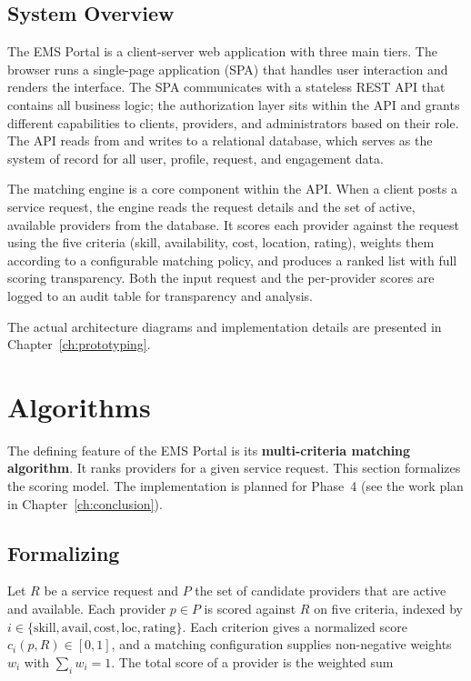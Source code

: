 \subsection{System Overview}
The EMS Portal is a client-server web application with three main tiers. The
browser runs a single-page application (SPA) that handles user interaction and
renders the interface. The SPA communicates with a stateless REST API that
contains all business logic; the authorization layer sits within the API and
grants different capabilities to clients, providers, and administrators based on
their role. The API reads from and writes to a relational database, which serves
as the system of record for all user, profile, request, and engagement data.

The matching engine is a core component within the API. When a client posts a
service request, the engine reads the request details and the set of active,
available providers from the database. It scores each provider against the request
using the five criteria (skill, availability, cost, location, rating), weights
them according to a configurable matching policy, and produces a ranked list with
full scoring transparency. Both the input request and the per-provider scores are
logged to an audit table for transparency and analysis.

The actual architecture diagrams and implementation details are presented in
Chapter~\ref{ch:prototyping}.

\section{Algorithms}
The defining feature of the EMS Portal is its \textbf{multi-criteria matching
algorithm}. It ranks providers for a given service request. This section
formalizes the scoring model. The implementation is planned for Phase~4 (see the
work plan in Chapter~\ref{ch:conclusion}).

\subsection{Formalizing}
Let $R$ be a service request and $P$ the set of candidate providers that are
active and available. Each provider $p \in P$ is scored against $R$ on five
criteria, indexed by $i \in \{\text{skill}, \text{avail}, \text{cost},
\text{loc}, \text{rating}\}$. Each criterion gives a normalized score
$c_i(p, R) \in [0, 1]$, and a matching configuration supplies non-negative
weights $w_i$ with $\sum_i w_i = 1$. The total score of a provider is the
weighted sum

